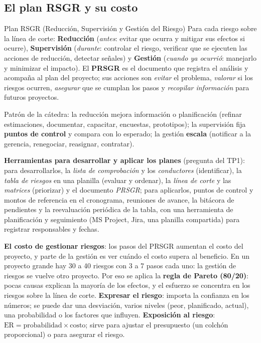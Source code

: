 \documentclass[11pt,a4paper]{article}
\begin{document}
\subsection{El plan RSGR y su costo}
\begin{defbox}{Plan RSGR (Reducción, Supervisión y Gestión del Riesgo)}
Para cada riesgo sobre la línea de corte: \textbf{Reducción} (\emph{antes}: evitar que ocurra y mitigar sus
efectos si ocurre), \textbf{Supervisión} (\emph{durante}: controlar el riesgo, verificar que se ejecuten las
acciones de reducción, detectar señales) y \textbf{Gestión} (\emph{cuando ya ocurrió}: manejarlo y minimizar el
impacto). El \textbf{PRSGR} es el documento que registra el análisis y acompaña al plan del proyecto; sus
acciones son \emph{evitar} el problema, \emph{valorar} si los riesgos ocurren, \emph{asegurar} que se cumplan
los pasos y \emph{recopilar información} para futuros proyectos.
\end{defbox}
Patrón de la cátedra: la reducción mejora información o planificación (refinar estimaciones, documentar,
capacitar, encuestas, prototipos); la supervisión fija \textbf{puntos de control} y compara con lo esperado;
la gestión \textbf{escala} (notificar a la gerencia, renegociar, reasignar, contratar).

\textbf{Herramientas para desarrollar y aplicar los planes} (pregunta del TP1): para desarrollarlos, la
\emph{lista de comprobación} y los \emph{conductores} (identificar), la \emph{tabla de riesgos} en una planilla
(evaluar y ordenar), la \emph{línea de corte} y las \emph{matrices} (priorizar) y el documento \emph{PRSGR}; para
aplicarlos, puntos de control y montos de referencia en el cronograma, reuniones de avance, la bitácora de
pendientes y la reevaluación periódica de la tabla, con una herramienta de planificación y seguimiento (MS
Project, Jira, una planilla compartida) para registrar responsables y fechas.

\textbf{El costo de gestionar riesgos}: los pasos del PRSGR aumentan el costo del proyecto, y parte de la
gestión es ver cuándo el costo supera al beneficio. En un proyecto grande hay 30 a 40 riesgos con 3 a 7 pasos
cada uno: la gestión de riesgos se vuelve otro proyecto. Por eso se aplica la \textbf{regla de Pareto (80/20)}:
pocas causas explican la mayoría de los efectos, y el esfuerzo se concentra en los riesgos sobre la línea de
corte. \textbf{Expresar el riesgo}: importa la confianza en los números; se puede dar una desviación, varios
niveles (peor, planificado, actual), una probabilidad o los factores que influyen. \textbf{Exposición al
riesgo}: $\mathrm{ER} = \text{probabilidad} \times \text{costo}$; sirve para ajustar el presupuesto (un
colchón proporcional) o para asegurar el riesgo.
\end{document}

